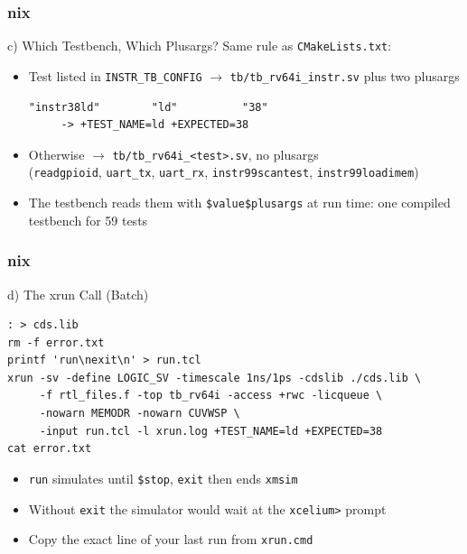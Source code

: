 \documentclass{beamer}
\newcommand{\astitle}{nix}
\newcommand{\assubtitle}{nix}
\newcommand{\cmd}[1]{\texttt{#1}}
\begin{document}
\renewcommand{\assubtitle}{c) Which Testbench, Which Plusargs?}
\begin{frame}[fragile]
\frametitle{\astitle}
\begin{block}{\assubtitle}
  Same rule as \cmd{CMakeLists.txt}:
  \begin{itemize}
    \item Test listed in \cmd{INSTR\_TB\_CONFIG} $\rightarrow$
      \cmd{tb/tb\_rv64i\_instr.sv} plus two plusargs
\begin{lstlisting}
"instr38ld"        "ld"          "38"
     -> +TEST_NAME=ld +EXPECTED=38
\end{lstlisting}
    \item Otherwise $\rightarrow$ \cmd{tb/tb\_rv64i\_<test>.sv}, no plusargs\\
      (\cmd{readgpioid}, \cmd{uart\_tx}, \cmd{uart\_rx}, \cmd{instr99scantest},
      \cmd{instr99loadimem})
    \item The testbench reads them with \cmd{\$value\$plusargs}
      at run time: one compiled testbench for 59 tests
  \end{itemize}
\end{block}
\end{frame}

\renewcommand{\assubtitle}{d) The xrun Call (Batch)}
\begin{frame}[fragile]
\frametitle{\astitle}
\begin{block}{\assubtitle}
\begin{lstlisting}[style=sh]
: > cds.lib
rm -f error.txt
printf 'run\nexit\n' > run.tcl
xrun -sv -define LOGIC_SV -timescale 1ns/1ps -cdslib ./cds.lib \
     -f rtl_files.f -top tb_rv64i -access +rwc -licqueue \
     -nowarn MEMODR -nowarn CUVWSP \
     -input run.tcl -l xrun.log +TEST_NAME=ld +EXPECTED=38
cat error.txt
\end{lstlisting}
  \begin{itemize}
    \item \cmd{run} simulates until \cmd{\$stop}, \cmd{exit} then ends \cmd{xmsim}
    \item Without \cmd{exit} the simulator would wait at the \cmd{xcelium>} prompt
    \item Copy the exact line of your last run from \cmd{xrun.cmd}
  \end{itemize}
\end{block}
\end{frame}
\end{document}

